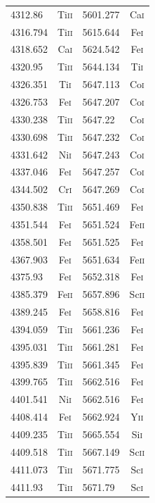 \begin{longtable}[c]{|l|c|l|c|}
4312.86 & Ti\textsc{ii} & 5601.277 & Ca\textsc{i}\\  
4316.794 & Ti\textsc{ii} & 5615.644 & Fe\textsc{i}\\ 
4318.652 & Ca\textsc{i} & 5624.542 & Fe\textsc{i}\\  
4320.95 & Ti\textsc{ii} & 5644.134 & Ti\textsc{i}\\  
4326.351 & Ti\textsc{i} & 5647.113 & Co\textsc{i}\\  
4326.753 & Fe\textsc{i} & 5647.207 & Co\textsc{i}\\  
4330.238 & Ti\textsc{ii} & 5647.22 & Co\textsc{i}\\  
4330.698 & Ti\textsc{ii} & 5647.232 & Co\textsc{i}\\ 
4331.642 & Ni\textsc{i} & 5647.243 & Co\textsc{i}\\  
4337.046 & Fe\textsc{i} & 5647.257 & Co\textsc{i}\\  
4344.502 & Cr\textsc{i} & 5647.269 & Co\textsc{i}\\  
4350.838 & Ti\textsc{ii} & 5651.469 & Fe\textsc{i}\\ 
4351.544 & Fe\textsc{i} & 5651.524 & Fe\textsc{ii}\\ 
4358.501 & Fe\textsc{i} & 5651.525 & Fe\textsc{i}\\  
4367.903 & Fe\textsc{i} & 5651.634 & Fe\textsc{ii}\\ 
4375.93 & Fe\textsc{i} & 5652.318 & Fe\textsc{i}\\   
4385.379 & Fe\textsc{ii} & 5657.896 & Sc\textsc{ii}\\
4389.245 & Fe\textsc{i} & 5658.816 & Fe\textsc{i}\\  
4394.059 & Ti\textsc{ii} & 5661.236 & Fe\textsc{i}\\ 
4395.031 & Ti\textsc{ii} & 5661.281 & Fe\textsc{i}\\ 
4395.839 & Ti\textsc{ii} & 5661.345 & Fe\textsc{i}\\ 
4399.765 & Ti\textsc{ii} & 5662.516 & Fe\textsc{i}\\ 
4401.541 & Ni\textsc{i} & 5662.516 & Fe\textsc{i}\\  
4408.414 & Fe\textsc{i} & 5662.924 & Y\textsc{ii}\\  
4409.235 & Ti\textsc{ii} & 5665.554 & Si\textsc{i}\\ 
4409.518 & Ti\textsc{ii} & 5667.149 & Sc\textsc{ii}\\
4411.073 & Ti\textsc{ii} & 5671.775 & Sc\textsc{i}\\ 
4411.93 & Ti\textsc{ii} & 5671.79 & Sc\textsc{i}\\   

\end{longtable}
